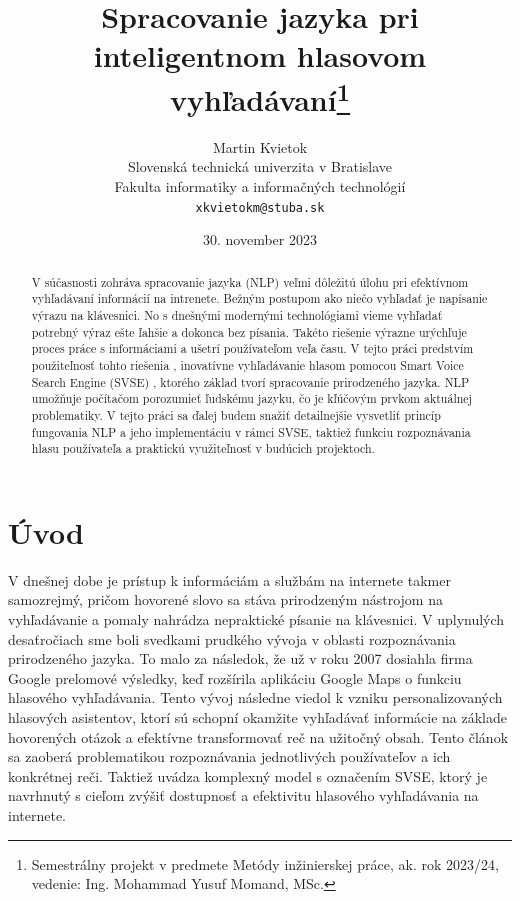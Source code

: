 \documentclass[10pt,slovak,a4paper]{article}
\title{Spracovanie jazyka pri inteligentnom hlasovom vyhľadávaní\thanks{Semestrálny projekt v predmete Metódy inžinierskej práce, ak. rok 2023/24, vedenie: Ing. Mohammad Yusuf Momand, MSc.}} %
\author{Martin Kvietok\\[2pt]
	{\small Slovenská technická univerzita v Bratislave}\\
	{\small Fakulta informatiky a informačných technológií}\\
	{\small \texttt{xkvietokm@stuba.sk}}
	}
\date{\small 30. november 2023}
\begin{document}
\maketitle
\begin{abstract}

V súčasnosti zohráva spracovanie jazyka (NLP) veľmi dôležitú úlohu pri efektívnom vyhľadávaní informácií na intrenete. Bežným postupom ako niečo vyhľadať je napísanie výrazu na klávesnici. No s dnešnými modernými technológiami vieme vyhľadať potrebný výraz ešte ľahšie a dokonca bez písania. Takéto riešenie výrazne urýchľuje proces práce s informáciami a ušetrí používateľom veľa času. V tejto práci predstvím použiteľnosť tohto riešenia , inovatívne vyhľadávanie hlasom pomocou Smart Voice Search Engine (SVSE)
, ktorého základ tvorí spracovanie prirodzeného jazyka. NLP umožňuje počítačom porozumieť ľudskému jazyku, čo je kľúčovým prvkom aktuálnej problematiky. V tejto práci sa ďalej budem snažiť detailnejšie vysvetliť princíp fungovania NLP a jeho implementáciu v rámci SVSE, taktiež funkciu rozpoznávania hlasu používateľa a praktickú využiteľnosť v budúcich projektoch.
\end{abstract}

\section{Úvod}
V dnešnej dobe je prístup k informáciám a službám na internete takmer samozrejmý, pričom hovorené slovo sa stáva prirodzeným nástrojom na vyhľadávanie a pomaly nahrádza nepraktické písanie na klávesnici. V uplynulých desaťročiach sme boli svedkami prudkého vývoja v oblasti rozpoznávania prirodzeného jazyka. To malo za následok, že už v roku 2007 dosiahla firma Google prelomové výsledky, keď rozšírila aplikáciu Google Maps o funkciu hlasového vyhľadávania. Tento vývoj následne viedol k vzniku personalizovaných hlasových asistentov, ktorí sú schopní okamžite vyhľadávať informácie na základe hovorených otázok a efektívne transformovať reč na užitočný obsah. Tento článok sa zaoberá problematikou rozpoznávania jednotlivých používateľov a ich konkrétnej reči. Taktiež uvádza komplexný model s označením SVSE, ktorý je navrhnutý s cieľom zvýšiť dostupnosť a efektivitu hlasového vyhľadávania na internete.
\end{document}
